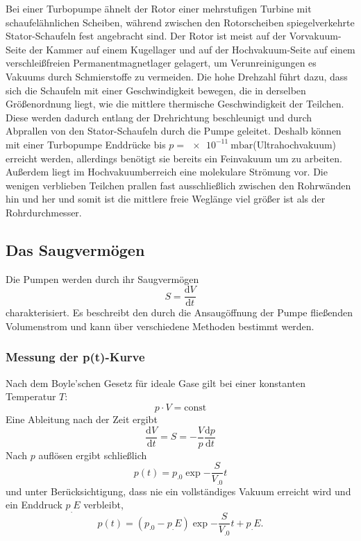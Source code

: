 Bei einer Turbopumpe ähnelt der Rotor einer mehrstufigen Turbine mit schaufelähnlichen Scheiben, während zwischen den Rotorscheiben spiegelverkehrte Stator-Schaufeln fest angebracht sind.
Der Rotor ist meist auf der Vorvakuum-Seite der Kammer auf einem Kugellager und auf der Hochvakuum-Seite auf einem verschleißfreien Permanentmagnetlager gelagert, um Verunreinigungen es Vakuums durch Schmierstoffe zu vermeiden.\cite{Pfeiffer} Die hohe Drehzahl führt dazu, dass sich die Schaufeln mit einer Geschwindigkeit bewegen, die in derselben Größenordnung liegt, wie die mittlere thermische Geschwindigkeit der Teilchen. Diese werden dadurch entlang der Drehrichtung beschleunigt und durch Abprallen von den Stator-Schaufeln durch die Pumpe geleitet. Deshalb können mit einer Turbopumpe Enddrücke bis $p=\SI{e-11}{\milli\bar}$(Ultrahochvakuum) erreicht werden, allerdings benötigt sie bereits ein Feinvakuum um zu arbeiten. Außerdem liegt im Hochvakuumberreich eine molekulare Strömung vor. Die wenigen verblieben Teilchen prallen fast ausschließlich zwischen den Rohrwänden hin und her und somit ist die mittlere freie Weglänge viel größer ist als der Rohrdurchmesser.


\subsection{Das Saugvermögen}
Die Pumpen werden durch ihr Saugvermögen 
\[
S=\frac{\mathrm{d}V}{\mathrm{d}t}
\]
charakterisiert.
Es beschreibt den durch die Ansaugöffnung der Pumpe fließenden Volumenstrom und kann über verschiedene Methoden bestimmt werden.

\subsubsection{Messung der p(t)-Kurve}

Nach dem Boyle'schen Gesetz für ideale Gase gilt bei einer konstanten Temperatur $T$:
\begin{equation}
p\cdot V =\text{const}\label{eq:Boyle}
\end{equation}
Eine Ableitung nach der Zeit ergibt
\[
\frac{\mathrm{d}V}{\mathrm{d}t} = S = - \frac{V}{p} \frac{\mathrm{d}p}{\mathrm{d}t}
\]
Nach $p$ auflösen ergibt schließlich
\begin{equation}
p(t)=p_.0\exp{-\frac{S}{V_.0}t}\label{eq:pt1}
\end{equation}
und unter  Berücksichtigung, dass nie ein vollständiges Vakuum erreicht wird und ein Enddruck $p_.E$ verbleibt,
\begin{equation}
p(t)=(p_.0-p_.E)\exp{-\frac{S}{V_.0}t}+p_.E\text{.}\label{eq:pt2}
\end{equation}

